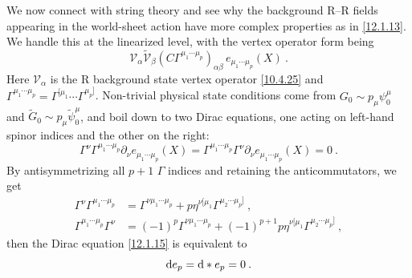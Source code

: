 We now connect with string theory and see why the background R--R fields appearing in the world-sheet action have more complex properties as in \eqref{12.1.13}. We handle this at the linearized level, with the vertex operator form being
\begin{equation}
	\mathscr{V}_{\alpha}\tilde{\mathscr{V}}_{\beta}(C\Gamma^{\mu_{1}\cdots\mu_{p}})_{\alpha\beta}\,e_{\mu_{1}\cdots\mu_{p}}(X) \:. \label{12.1.14}
\end{equation}
Here $\mathscr{V}_{\alpha}$ is the R background state vertex operator \eqref{10.4.25} and $\Gamma^{\mu_{1}\cdots\mu_{p}}=\Gamma^{[\mu_{1}}\cdots\Gamma^{\mu_{p}]}$. Non-trivial physical state conditions come from $G_{0}\sim p_{\mu}\psi_{0}^{\mu}$ and $\tilde{G}_{0}\sim p_{\mu}\tilde{\psi}_{0}^{\mu}$, and boil down to two Dirac equations, one acting on left-hand spinor indices and the other on the right:
\begin{equation}
	\Gamma^{\nu}\Gamma^{\mu_{1}\cdots\mu_{p}}\partial_{\nu}e_{\mu_{1}\cdots \mu_{p}}(X)=
	\Gamma^{\mu_{1}\cdots\mu_{p}}\Gamma^{\nu}\partial_{\nu}e_{\mu_{1}\cdots \mu_{p}}(X)=0\:.\label{12.1.15}
\end{equation}
By antisymmetrizing all $p+1$ $\Gamma$ indices and retaining the anticommutators, we get
\begin{subequations} \label{12.1.16} %
	\begin{align}
		\Gamma^{\nu}\Gamma^{\mu_{1}\cdots\mu_{p}}&=\Gamma^{\nu\mu_{1}\cdots\mu_{p}}+p\eta^{\nu[\mu_{1}}\Gamma^{\mu_{2}\cdots\mu_{p}]}\:, \label{12.1.16a} \\  
		\Gamma^{\mu_{1}\cdots\mu_{p}}\Gamma^{\nu}&=(-1)^{p}\Gamma^{\nu\mu_{1}\cdots\mu_{p}}+(-1)^{p+1}p\eta^{\nu[\mu_{1}}\Gamma^{\mu_{2}\cdots\mu_{p}]}\:, \label{12.1.16b} 
	\end{align} 
\end{subequations}
then the Dirac equation \eqref{12.1.15} is equivalent to
\begin{equation}
	\mathrm{d} e_{p} = \mathrm{d}\ast e_{p}=0 \:. \label{12.1.17}
\end{equation}
